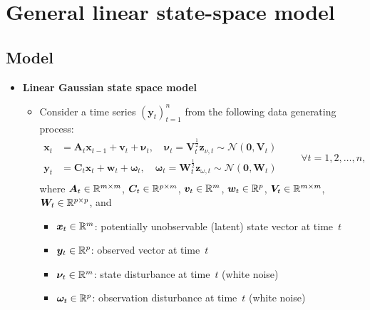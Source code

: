 \documentclass[12pt,a4paper]{article}
\begin{document}
\clearpage

\section{General linear state-space model}

\subsection{Model}

\begin{itemize}

\item \textbf{Linear Gaussian state space model}
  \begin{itemize}
  \item Consider a time series $(\bm{y}_{t})_{t=1}^{n}$ from the following
    data generating process:
    \begin{equation}\label{eq:model_linear}%
      \begin{aligned}
        \bm{x}_{t} & = \bm{A}_{t}\bm{x}_{t-1} + \bm{v}_{t} + \bm{\nu}_{t}, \quad \bm{\nu}_{t}=\bm{V}_{t}^{\frac{1}{2}}\bm{z}_{\nu,t} \sim \mathcal{N}(\bm{0},\bm{V}_{t}) \\
        \bm{y}_{t} & =  \bm{C}_{t}\bm{x}_{t} + \bm{w}_{t} + \bm{\omega}_{t}, \quad \bm{\omega}_{t}=\bm{W}_{t}^{\frac{1}{2}}\bm{z}_{\omega,t} \sim \mathcal{N}(\bm{0},\bm{W}_{t}) \\
      \end{aligned}
      \qquad \forall t = 1, 2, \ldots, n,
    \end{equation}
    where $\bm{A}_{t}\in\mathbb{R}^{m\times m}$,
    $\bm{C}_{t}\in \mathbb{R}^{p\times m}$,
    $\bm{v}_{t}\in \mathbb{R}^{m}$, $\bm{w}_{t}\in\mathbb{R}^{p}$,
    $\bm{V}_{t}\in \mathbb{R}^{m\times m}$, $\bm{W}_{t}\in\mathbb{R}^{p\times p}$,
    and
    \begin{itemize}
    \item $\bm{x}_{t}\in\mathbb{R}^{m}$: potentially unobservable (latent)
      state vector at time~$t$
    \item $\bm{y}_{t}\in\mathbb{R}^{p}$: observed vector at time~$t$
    \item $\bm{\nu}_{t}\in\mathbb{R}^{m}$: state disturbance at time~$t$ (white
      noise)
    \item $\bm{\omega}_{t}\in\mathbb{R}^{p}$: observation disturbance at time~$t$
      (white noise)
    \end{itemize}

  \end{itemize}

\end{itemize}
\end{document}
